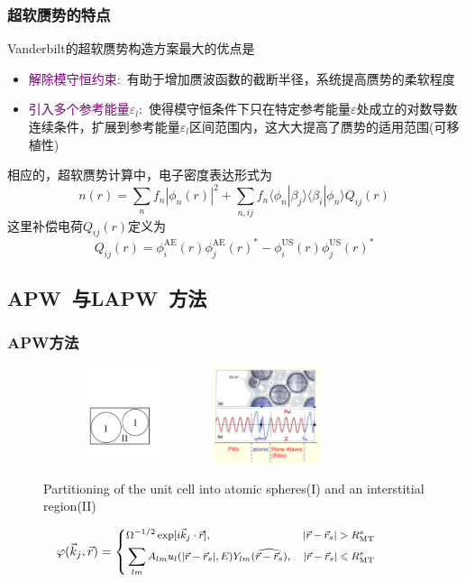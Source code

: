 \frame
{
\frametitle{超软赝势的特点}
\textrm{Vanderbilt}的超软赝势构造方案最大的优点是
\begin{itemize}
	\item \textcolor{purple}{解除模守恒约束}:~有助于增加赝波函数的截断半径，系统提高赝势的柔软程度
	\item \textcolor{purple}{引入多个参考能量$\varepsilon_l$}:~使得模守恒条件下只在特定参考能量$\varepsilon$处成立的对数导数连续条件，扩展到参考能量$\varepsilon_l$区间范围内，这大大提高了赝势的适用范围(可移植性)
\end{itemize}

相应的，超软赝势计算中，电子密度表达形式为
\begin{displaymath}
	n(r)=\sum_nf_n|\phi_n(r)|^2+\sum_{n,ij}f_n\langle\phi_n|\beta_j\rangle\langle\beta_i|\phi_n\rangle Q_{ij}(r)
\end{displaymath}
这里补偿电荷$Q_{ij}(r)$定义为
\begin{displaymath}
	Q_{ij}(r)=\phi_i^{\mathrm{AE}}(r)\phi_j^{\mathrm{AE}}(r)^{\ast}-\phi_i^{\mathrm{US}}(r)\phi_j^{\mathrm{US}}(r)^{\ast}
\end{displaymath}
}

\subsection{\rm{APW~}与\rm{LAPW~}方法}
\frame
{
\frametitle{\textrm{APW}方法}
\begin{figure}[h!]
\centering
\includegraphics[height=1.10in,width=1.80in,viewport=40 150 545 465,clip]{Figures/Muffin_tin.pdf}
\includegraphics[height=1.10in,width=1.45in,viewport=1 20 485 435,clip]{Figures/APW.png}
\caption{\tiny \textrm{Partitioning of the unit cell into atomic spheres(I) and an interstitial region(II)}}%
\label{Muffin_tin-2}
\end{figure}
\begin{displaymath}
\hskip -28pt\footnotesize \varphi(\vec k_j,\vec r)=\left\{
  \begin{aligned}
    &\Omega^{-1/2}\exp[i\vec k_j\cdot\vec r],&|\vec r-\vec r_s|>R_{\mathrm{MT}}^s\\
    &\sum_{lm}A_{lm}u_l(|\vec r-\vec r_s|,E)Y_{lm}(\widehat{\vec r-\vec r_s}),&|\vec r-\vec r_s|\leqslant R_{\mathrm{MT}}^s
  \end{aligned}
\right.
\end{displaymath}
}

